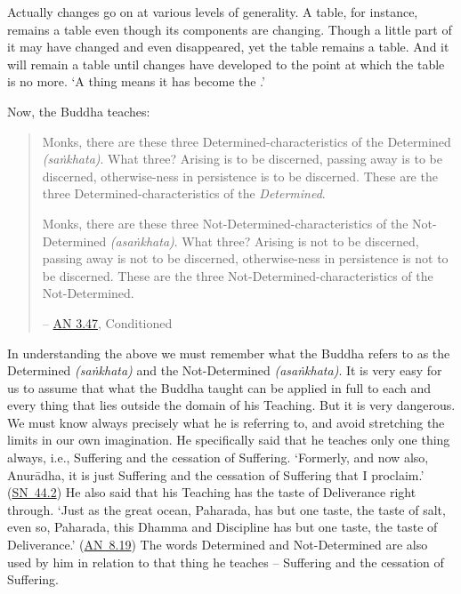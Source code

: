 Actually changes go on at various levels of generality. A table, for instance, remains a table even though its components are changing. Though a little part of it may have changed and even disappeared, yet the table remains a table. And it will remain a table until changes have developed to the point at which the table is no more. `A thing  means it has become the .'

\clearpage

Now, the Buddha teaches:

\begin{quote}
Monks, there are these three Determined-characteristics of the Determined \emph{(saṅkhata)}. What three? Arising is to be discerned, passing away is to be discerned, otherwise-ness in persistence is to be discerned. These are the three Determined-characteristics of the \emph{Determined}.

Monks, there are these three Not-Determined-characteristics of the Not-Determined \emph{(asaṅkhata)}. What three? Arising is not to be discerned, passing away is not to be discerned, otherwise-ness in persistence is not to be discerned. These are the three Not-Determined-characteristics of the Not-Determined.

 -- \href{https://suttacentral.net/an3.47/en/bodhi}{AN 3.47}, Conditioned
\end{quote}

In understanding the above we must remember what the Buddha refers to as the Determined \emph{(saṅkhata)} and the Not-Determined \emph{(asaṅkhata)}. It is very easy for us to assume that what the Buddha taught can be applied in full to each and every thing that lies outside the domain of his Teaching. But it is very dangerous. We must know always precisely what he is referring to, and avoid stretching the limits in our own imagination. He specifically said that he teaches only one thing always, i.e., Suffering and the cessation of Suffering. `Formerly, and now also, Anurādha, it is just Suffering and the cessation of Suffering that I proclaim.' (\href{https://suttacentral.net/sn44.2/en/sujato}{SN~44.2}) He also said that his Teaching has the taste of Deliverance right through. `Just as the great ocean, Paharada, has but one taste, the taste of salt, even so, Paharada, this Dhamma and Discipline has but one taste, the taste of Deliverance.' (\href{https://suttacentral.net/an8.19/en/bodhi}{AN~8.19}) The words Determined and Not-Determined are also used by him in relation to that  thing he teaches -- Suffering and the cessation of Suffering.

